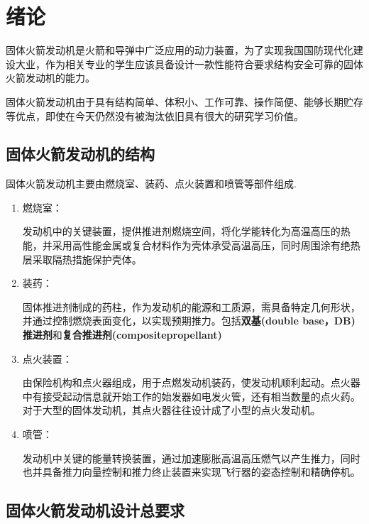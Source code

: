 
\chapter{绪论}

固体火箭发动机是火箭和导弹中广泛应用的动力装置，为了实现我国国防现代化建设大业，作为相关专业的学生应该具备设计一款性能符合要求结构安全可靠的固体火箭发动机的能力。

固体火箭发动机由于具有结构简单、体积小、工作可靠、操作简便、能够长期贮存等优点，即使在今天仍然没有被淘汰依旧具有很大的研究学习价值。

\section{固体火箭发动机的结构}

固体火箭发动机主要由燃烧室、装药、点火装置和喷管等部件组成.

\begin{enumerate}[leftmargin=2em]
  \item 燃烧室：
  
  发动机中的关键装置，提供推进剂燃烧空间，将化学能转化为高温高压的热能，并采用高性能金属或复合材料作为壳体承受高温高压，同时周围涂有绝热层采取隔热措施保护壳体。
  \item 装药：
  
  固体推进剂制成的药柱，作为发动机的能源和工质源，需具备特定几何形状，并通过控制燃烧表面变化，以实现预期推力。包括\textbf{双基(double base，DB)推进剂}和\textbf{复合推进剂(compositepropellant)}

  \item 点火装置：
  
  由保险机构和点火器组成，用于点燃发动机装药，使发动机顺利起动。点火器中有接受起动信息就开始工作的始发器如电发火管，还有相当数量的点火药。对于大型的固体发动机，其点火器往往设计成了小型的点火发动机。

  \item 喷管：
  
  发动机中关键的能量转换装置，通过加速膨胀高温高压燃气以产生推力，同时也并具备推力向量控制和推力终止装置来实现飞行器的姿态控制和精确停机。
\end{enumerate}



\section{固体火箭发动机设计总要求}


